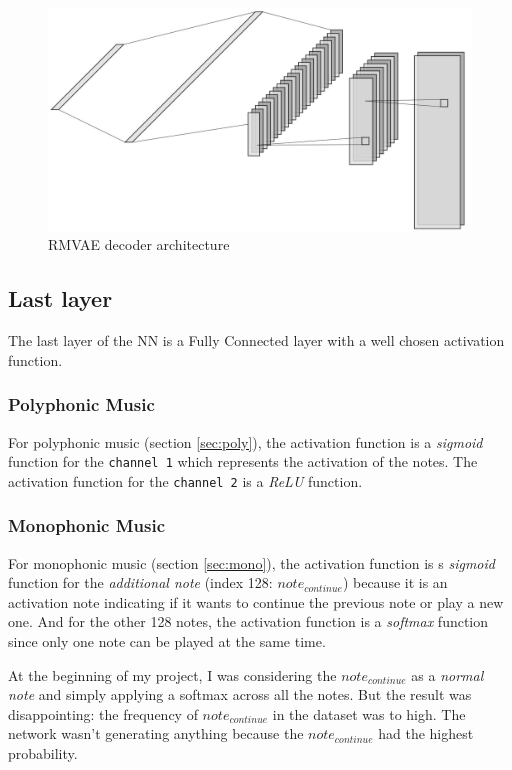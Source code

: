 \documentclass[12pt]{report}
\begin{document}
\begin{figure}[ht]
    \centering
    \includegraphics[width=\textwidth]{images/nn/architectures/rmvae/decoder.jpg}
    \caption{RMVAE decoder architecture}
    \label{fig:rmvae_decoder}
\end{figure}

\subsection{Last layer}

The last layer of the NN is a Fully Connected layer with a well chosen activation function.

\subsubsection{Polyphonic Music}

For polyphonic music (section \ref{sec:poly}), the activation function is a \textit{sigmoid} function for the \texttt{channel 1} which represents the activation of the notes.
The activation function for the \texttt{channel 2} is a \textit{ReLU} function.

\subsubsection{Monophonic Music}
\label{sec:last-layer-mono}

For monophonic music (section \ref{sec:mono}), the activation function is s \textit{sigmoid} function for the \textit{additional note} (index 128: $note_{continue}$) because it is an activation note indicating if it wants to continue the previous note or play a new one. And for the other 128 notes, the activation function is a \textit{softmax} function since only one note can be played at the same time.

At the beginning of my project, I was considering the $note_{continue}$ as a \textit{normal note} and simply applying a softmax across all the notes.
But the result was disappointing: the frequency of $note_{continue}$ in the dataset was to high.
The network wasn't generating anything because the $note_{continue}$ had the highest probability.
\end{document}
